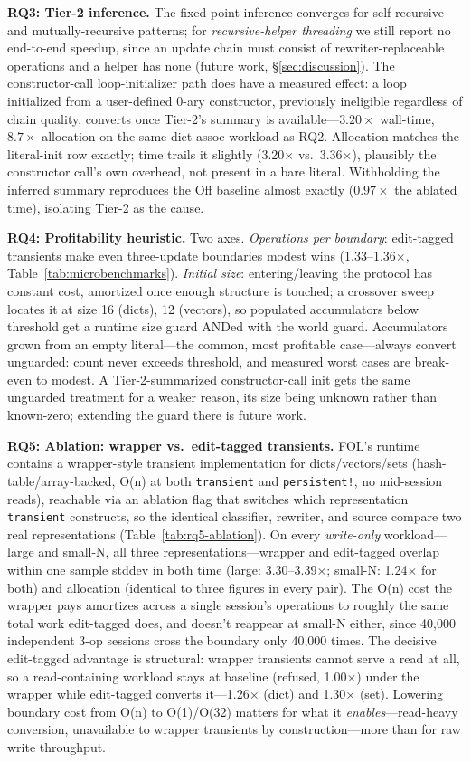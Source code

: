 \documentclass[sigplan,review,anonymous]{acmart}
\begin{document}
\textbf{RQ3: Tier-2 inference.} The fixed-point inference converges for self-recursive and mutually-recursive patterns; for \emph{recursive-helper threading} we still report no end-to-end speedup, since an update chain must consist of rewriter-replaceable operations and a helper has none (future work, §\ref{sec:discussion}). The constructor-call loop-initializer path does have a measured effect: a loop initialized from a user-defined 0-ary constructor, previously ineligible regardless of chain quality, converts once Tier-2's summary is available---$3.20\times$ wall-time, $8.7\times$ allocation on the same dict-assoc workload as RQ2. Allocation matches the literal-init row exactly; time trails it slightly (3.20$\times$ vs.\ 3.36$\times$), plausibly the constructor call's own overhead, not present in a bare literal. Withholding the inferred summary reproduces the Off baseline almost exactly ($0.97\times$ the ablated time), isolating Tier-2 as the cause.

\textbf{RQ4: Profitability heuristic.} Two axes. \emph{Operations per boundary}: edit-tagged transients make even three-update boundaries modest wins (1.33--1.36$\times$, Table~\ref{tab:microbenchmarks}). \emph{Initial size}: entering/leaving the protocol has constant cost, amortized once enough structure is touched; a crossover sweep locates it at size 16 (dicts), 12 (vectors), so populated accumulators below threshold get a runtime size guard ANDed with the world guard. Accumulators grown from an empty literal---the common, most profitable case---always convert unguarded: count never exceeds threshold, and measured worst cases are break-even to modest. A Tier-2-summarized constructor-call init gets the same unguarded treatment for a weaker reason, its size being unknown rather than known-zero; extending the guard there is future work.

\textbf{RQ5: Ablation: wrapper vs.\ edit-tagged transients.} FOL's runtime contains a wrapper-style transient implementation for dicts/vectors/sets (hash-table/array-backed, O(n) at both \texttt{transient} and \texttt{persistent!}, no mid-session reads), reachable via an ablation flag that switches which representation \texttt{transient} constructs, so the identical classifier, rewriter, and source compare two real representations (Table~\ref{tab:rq5-ablation}). On every \emph{write-only} workload---large and small-N, all three representations---wrapper and edit-tagged overlap within one sample stddev in both time (large: 3.30--3.39$\times$; small-N: 1.24$\times$ for both) and allocation (identical to three figures in every pair). The O(n) cost the wrapper pays amortizes across a single session's operations to roughly the same total work edit-tagged does, and doesn't reappear at small-N either, since 40,000 independent 3-op sessions cross the boundary only 40,000 times. The decisive edit-tagged advantage is structural: wrapper transients cannot serve a read at all, so a read-containing workload stays at baseline (refused, 1.00$\times$) under the wrapper while edit-tagged converts it---1.26$\times$ (dict) and 1.30$\times$ (set). Lowering boundary cost from O(n) to O(1)/O(32) matters for what it \emph{enables}---read-heavy conversion, unavailable to wrapper transients by construction---more than for raw write throughput.
\end{document}
